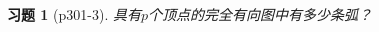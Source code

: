 \documentclass{article}
\begin{document}
\begin{CJK}{UTF8}{gbsn}
  \newtheorem*{Exercise}{习题}
  \huge
\begin{Exercise}[p301-3]
  具有$p$个顶点的完全有向图中有多少条弧？
\end{Exercise}

\end{CJK}
\end{document}
